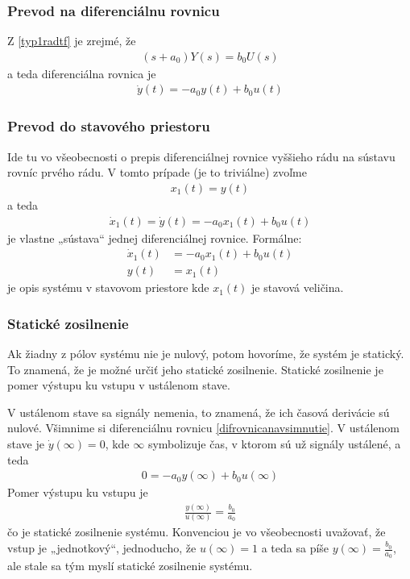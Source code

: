 \documentclass[a4paper, 10pt, ]{article}
\begin{document}
\subsubsection{Prevod na diferenciálnu rovnicu}

Z \eqref{typ1radtf} je zrejmé, že
\begin{align}
    (s + a_0) Y(s) = b_0 U(s)
\end{align}
a teda diferenciálna rovnica je
\begin{align} \label{difrovnicanavsimnutie}
    \dot y(t) = - a_0 y(t) + b_0 u(t)
\end{align}

\subsubsection{Prevod do stavového priestoru}

Ide tu vo všeobecnosti o prepis diferenciálnej rovnice vyššieho rádu na sústavu rovníc prvého rádu. V tomto prípade (je to triviálne) zvoľme
\begin{align}
    x_1(t) = y(t)
\end{align}
a teda
\begin{align}
    \dot x_1(t) = \dot y(t) = - a_0 x_1(t) + b_0 u(t)
\end{align}
je vlastne „sústava“ jednej diferenciálnej rovnice. Formálne:
\begin{align}
    \dot x_1(t) &= - a_0 x_1(t) + b_0 u(t) \\
    y(t) &= x_1(t)
\end{align}
je opis systému v stavovom priestore kde $x_1(t)$ je stavová veličina.




\subsubsection{Statické zosilnenie}

Ak žiadny z pólov systému nie je nulový, potom hovoríme, že systém je statický. To znamená, že je možné určiť jeho statické zosilnenie. Statické zosilnenie je pomer výstupu ku vstupu v ustálenom stave.

V ustálenom stave sa signály nemenia, to znamená, že ich časová derivácie sú nulové. Všimnime si diferenciálnu rovnicu \eqref{difrovnicanavsimnutie}. V ustálenom stave je $\dot y(\infty) = 0$, kde $\infty$ symbolizuje čas, v ktorom sú už signály ustálené, a teda
\begin{align}
    0 = -a_0 y(\infty) + b_0 u(\infty)
\end{align}
Pomer výstupu ku vstupu je
\begin{align}
    \frac{y(\infty)}{u(\infty)} = \frac{b_0 }{a_0}
\end{align}
čo je statické zosilnenie systému. Konvenciou je vo všeobecnosti uvažovať, že vstup je „jednotkový“, jednoducho, že $u(\infty) = 1$ a teda sa píše $y(\infty) = \frac{b_0 }{a_0}$, ale stale sa tým myslí statické zosilnenie systému.
\end{document}
